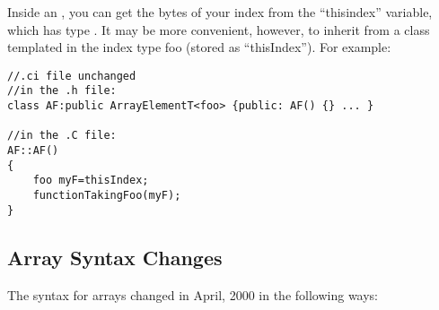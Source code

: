 Inside an , you can get the bytes of your index
from the ``thisindex'' variable, which has type .  
It may be more convenient, however, to inherit from  a 
class templated in the index type foo (stored as ``thisIndex'').
For example:

\begin{verbatim}
//.ci file unchanged
//in the .h file:
class AF:public ArrayElementT<foo> {public: AF() {} ... }

//in the .C file:
AF::AF()
{
    foo myF=thisIndex;
    functionTakingFoo(myF);
}
\end{verbatim}


\subsection{Array Syntax Changes}
The syntax for arrays changed in April, 2000 in the following ways:

